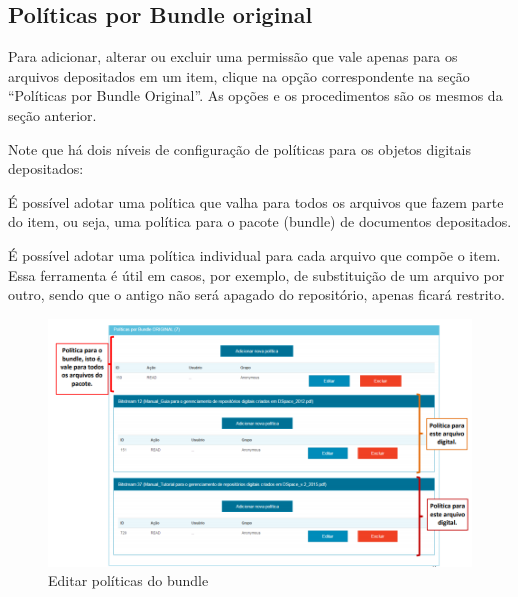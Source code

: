 \documentclass[12pt,hidelinks]{article}
\begin{document}
    \subsection{Políticas por Bundle original}
    
    \singlespacing
    
    Para adicionar, alterar ou excluir uma permissão que vale apenas para os arquivos depositados em um item, clique na opção correspondente na seção “Políticas por Bundle Original”. As opções e os procedimentos são os mesmos da seção anterior.
    
    \singlespacing
    
    Note que há dois níveis de configuração de políticas para os objetos digitais depositados:
    
    \singlespacing
    
    \textbullet \hspace{6pt} É possível adotar uma política que valha para todos os arquivos que fazem parte do item, ou seja, uma política para o pacote (bundle) de documentos depositados. 
    
    \singlespacing
    
    \textbullet \hspace{6pt} É possível adotar uma política individual para cada arquivo que compõe o item. Essa ferramenta é útil em casos, por exemplo, de substituição de um arquivo por outro, sendo que o antigo não será apagado do repositório, apenas ficará restrito.

    \begin{figure}[!htp]
                \centering
                \includegraphics[scale=0.7]{figura/Figura114.png}
                \caption{Editar políticas do bundle}
            \label{Rotulo}
        \end{figure}
\end{document}

